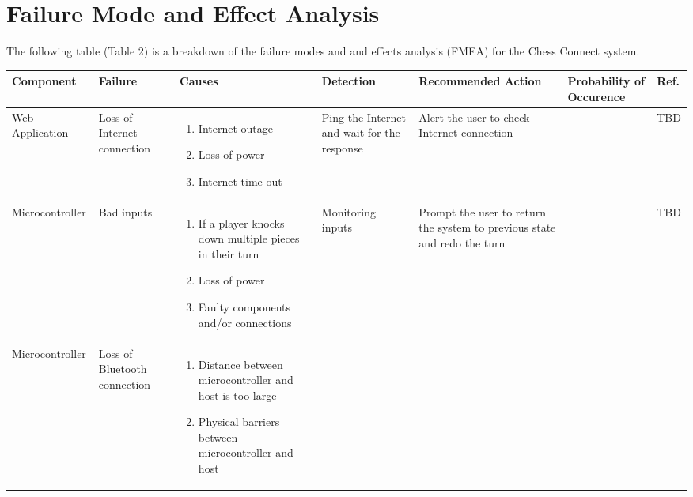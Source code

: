 \documentclass{article}
\begin{document}
\section{Failure Mode and Effect Analysis}
{The following table (Table 2) is a breakdown of the failure modes and and effects analysis (FMEA) for the Chess Connect system.}
\begin{table}[ht]
    \centering
        \setlength{\leftmargini}{0.4cm}
        \begin{tabular}{| >{\centering\arraybackslash}m{2.5cm} | 
          >{\centering\arraybackslash}m{2cm} | 
          >{\centering\arraybackslash}m{3cm} |
          >{\centering\arraybackslash}m{2cm} |
          >{\centering\arraybackslash}m{3cm} |
          >{\centering\arraybackslash}m{1.5cm} |
          >{\centering\arraybackslash}m{1cm} |}
        \hline
        \rowcolor[gray]{0.9}
        Component & Failure & Causes & Detection & Recommended Action & Probability of Occurence & Ref. \\
        \hline
        Web Application & Loss of Internet connection
        & \begin{enumerate}[label=(\alph*)]
            \item Internet outage 
            \item Loss of power
            \item Internet time-out 
        \end{enumerate} & Ping the Internet and wait for the response & Alert the user to check Internet connection & 0.3 & TBD \\
        \hline
        Microcontroller & Bad inputs &
        \begin{enumerate}[label=(\alph*)]
            \item If a player knocks down multiple pieces in their turn 
            \item Loss of power
            \item Faulty components and/or connections 
        \end{enumerate} & Monitoring inputs & Prompt the user to return the system to previous state and redo the turn & 0.4 & TBD \\ 
        \hline
        Microcontroller & Loss of Bluetooth connection & \begin{enumerate}[label=(\alph*)]
            \item Distance between microcontroller and host is too large
            \item Physical barriers between microcontroller and host

\end{enumerate}
\end{tabular}
\end{table}
\end{document}
